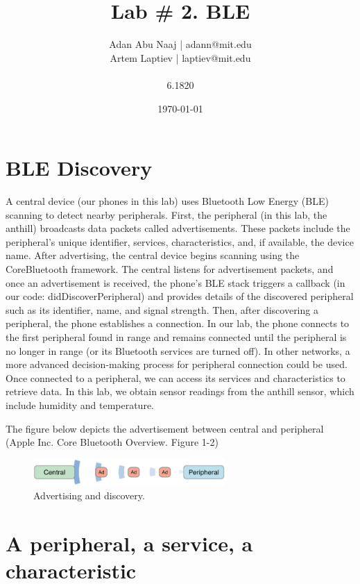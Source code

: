 \documentclass{lab}
\title{Lab \# 2. BLE} %
\author{Adan Abu Naaj | adann@mit.edu \\ Artem Laptiev | laptiev@mit.edu \\\\ 6.1820} %
\date{\today} %
\begin{document}
\maketitle

\newpage

\section{BLE Discovery}

A central device (our phones in this lab) uses Bluetooth Low Energy (BLE) scanning to detect nearby peripherals. First, the peripheral (in this lab, the anthill) broadcasts data packets called advertisements. These packets include the peripheral's unique identifier, services, characteristics, and, if available, the device name.
After advertising, the central device begins scanning using the CoreBluetooth framework. The central listens for advertisement packets, and once an advertisement is received, the phone’s BLE stack triggers a callback (in our code: didDiscoverPeripheral) and provides details of the discovered peripheral such as its identifier, name, and signal strength.
Then, after discovering a peripheral, the phone establishes a connection. In our lab, the phone connects to the first peripheral found in range and remains connected until the peripheral is no longer in range (or its Bluetooth services are turned off). In other networks, a more advanced decision-making process for peripheral connection could be used.
Once connected to a peripheral, we can access its services and characteristics to retrieve data. In this lab, we obtain sensor readings from the anthill sensor, which include humidity and temperature.

The figure below depicts the advertisement between central and peripheral (Apple Inc. Core Bluetooth Overview. Figure 1-2)


\begin{figure}[h]
    \begin{center}
    \includegraphics[width=0.65\textwidth]{images/AdvertisingAndDiscovery.png} 
    \caption{Advertising and discovery.}
    \end{center}
\end{figure}

\section{A peripheral, a service, a characteristic}
\end{document}

